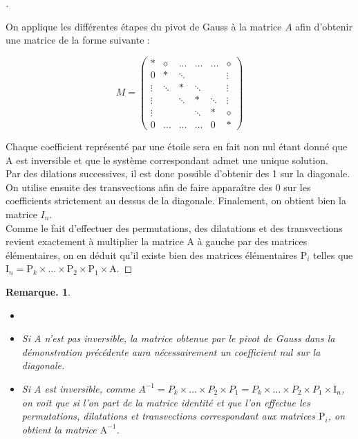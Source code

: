 \documentclass[12pt]{article}
\theoremstyle{break}
\newtheorem*{remark}{Remarque.}
\newenvironment{demo}[1][\proofname]{%
  \begin{proof}[#1]$ $\newline
}{%
  \end{proof}
}
\begin{document}
\begin{demo}
On applique les différentes étapes du pivot de Gauss à la matrice $A$ afin d'obtenir une matrice de la forme suivante :

$$
M=\left(\begin{array}{cccccc}
* & \diamond & \ldots & \ldots & \ldots & \diamond \\
0 & * & \ddots & & & \vdots \\
\vdots & \ddots & * & \ddots & & \vdots \\
\vdots & & \ddots & * & \ddots & \vdots \\
\vdots & & & \ddots & * & \diamond \\
0 & \ldots & \ldots & \ldots & 0 & *
\end{array}\right)
$$

Chaque coefficient représenté par une étoile sera en fait non nul étant donné que A est inversible et que le système correspondant admet une unique solution.\\
Par des dilations successives, il est donc possible d'obtenir des 1 sur la diagonale. On utilise ensuite des transvections afin de faire apparaître des 0 sur les coefficients strictement au dessus de la diagonale. Finalement, on obtient bien la matrice $I_{n}$.\\
Comme le fait d'effectuer des permutations, des dilatations et des transvections revient exactement à multiplier la matrice A à gauche par des matrices élémentaires, on en déduit qu'il existe bien des matrices élémentaires $\mathrm{P}_{i}$ telles que $\mathrm{I}_{n}=\mathrm{P}_{k} \times \ldots \times \mathrm{P}_{2} \times \mathrm{P}_{1} \times \mathrm{A}$.
\end{demo}

\begin{remark}
\begin{itemize}
  \item[]
  \item Si A n'est pas inversible, la matrice obtenue par le pivot de Gauss dans la démonstration précédente aura nécessairement un coefficient nul sur la diagonale.
  \item Si A est inversible, comme $A^{-1}=P_{k} \times \ldots \times P_{2} \times P_{1}=P_{k} \times \ldots \times P_{2} \times P_{1} \times \mathrm{I}_{n}$, on voit que si l'on part de la matrice identité et que l'on effectue les permutations, dilatations et transvections correspondant aux matrices $\mathrm{P}_{i}$, on obtient la matrice $\mathrm{A}^{-1}$.
\end{itemize}
\end{remark}
\end{document}
